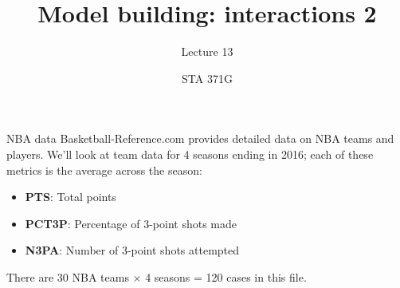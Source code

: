 \documentclass{beamer}\usepackage[]{graphicx}\usepackage[]{color}
\title{Model building: interactions 2}
\subtitle{Lecture 13}
\author{STA 371G}
\begin{document}
  
  

  \frame{\maketitle}



  \begin{darkframes}
    \begin{frame}{NBA data}
      Basketball-Reference.com provides detailed data on NBA teams and players. We'll look at team data for 4 seasons ending in 2016; each of these metrics is the average across the season:
      \begin{itemize}
        \item \textbf{PTS}: Total points
        \item \textbf{PCT3P}: Percentage of 3-point shots made
        \item \textbf{N3PA}: Number of 3-point shots attempted
      \end{itemize}
      There are 30 NBA teams $\times$ 4 seasons = 120 cases in this file.
    \end{frame}


\end{darkframes}
\end{document}
